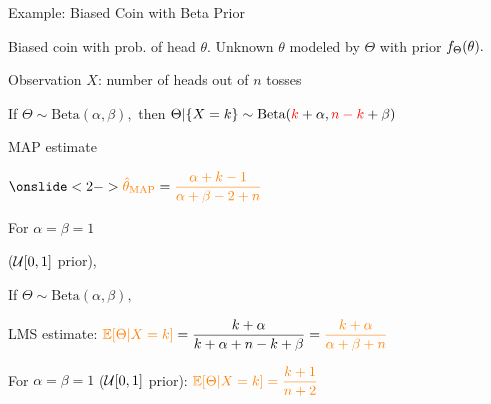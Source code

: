 \begin{frame}{Example: Biased Coin with Beta Prior}

\hfill {}

  \plitemsep 0.05in
\bci

\item<1-> Biased coin with prob. of head $\theta.$ Unknown $\theta$ modeled by $\Theta$ with prior $f_\Theta(\theta).$
\item<1-> Observation $X$: number of heads out of $n$ tosses
\item<1-> If $\Theta \sim \text{Beta}(\alpha,\beta),$ then $\Theta|\{X=k\} \sim \text{Beta}({\color{red} k}+\alpha,{\color{red} n-k}+\beta)$

\medskip
  {
    \small
    \plitemsep 0.02in
    \bci
  \item<2-> MAP estimate

    \medskip
    $\displaystyle \onslide<2->{\orangef{\hth_\MAP} = \orangef{\frac{\alpha + k -1}{\alpha + \beta -2 + n}}}$
    
  \item<2-> For $\alpha=\beta =1$

    ($\mathcal U[0,1]$ prior),

    \medskip
    \eci
  }
  {
    \small
    \plitemsep 0.02in
    \bci
  \item<3->  If $\Theta \sim \text{Beta}(\alpha,\beta),$
    
  \item<4-> LMS estimate:     $\displaystyle {\color{orange} \mathbb{E}[ \Theta|
        X=k ]} = \frac{k+\alpha}{k+\alpha + n -k +\beta} =
    {\color{orange} \frac{k+\alpha}{\alpha + \beta + n}}$

  \item<5-> For $\alpha=\beta =1$ ($\mathcal U[0,1]$ prior):   $\displaystyle {\color{orange} \mathbb{E}[ \Theta| X=k ] = \frac{k+1}{n+2}}$
    
    \eci
  }

\eci

\end{frame}





